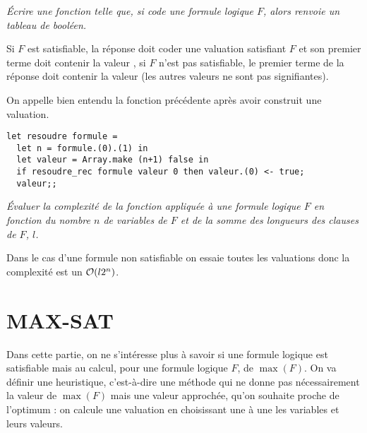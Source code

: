 \begin{Exercise}\it
Écrire une fonction  telle que, si  code une formule logique $F$, alors  renvoie un tableau de booléen.

Si $F$ est satisfiable, la réponse doit coder une valuation satisfiant $F$ et son premier terme doit contenir la valeur , si $F$ n'est pas satisfiable, le premier terme de la réponse doit contenir la valeur  (les autres valeurs ne sont pas signifiantes).
\end{Exercise}
\begin{Answer}On appelle bien entendu la fonction précédente après avoir construit une valuation.
\begin{lstlisting}
let resoudre formule =
  let n = formule.(0).(1) in
  let valeur = Array.make (n+1) false in
  if resoudre_rec formule valeur 0 then valeur.(0) <- true;
  valeur;;
\end{lstlisting}
\end{Answer}
\begin{Exercise}\it
Évaluer la complexité de la fonction  appliquée à une formule logique $F$ en fonction du nombre $n$ de variables de $F$ et de la somme des longueurs des clauses de $F$, $l$.
\end{Exercise}
\begin{Answer}
Dans le cas d'une formule non satisfiable on essaie toutes les valuations donc la complexité est un ${\cal O}(l2^n)$.
\newpage
\end{Answer}
\section{MAX-SAT}
Dans cette partie, on ne s’intéresse plus à savoir si une formule logique est satisfiable mais au calcul, pour une formule logique $F$, de $\max(F)$. On va définir une heuristique, c’est-à-dire une méthode qui ne donne pas nécessairement la valeur de $\max(F)$ mais une valeur approchée, qu’on souhaite proche de l’optimum : on calcule une valuation en choisissant une à une les variables et leurs valeurs. 

